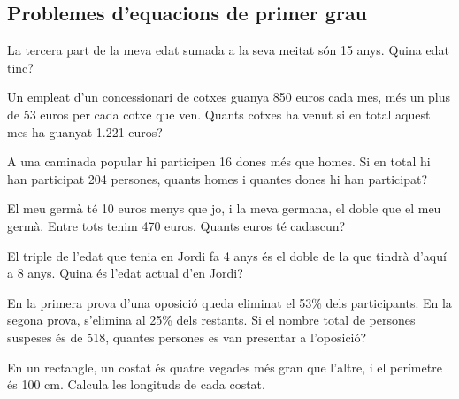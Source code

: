 \pagebreak
\subsection{Problemes d'equacions de primer grau}

\begin{mylist}
\exer  La tercera part de la meva edat sumada a la seva meitat són 15 anys. Quina edat tinc?  


\exer  Un empleat d'un concessionari de cotxes guanya 850 euros cada mes, més un plus de 53 euros per cada cotxe que ven. Quants cotxes ha venut si en total aquest mes ha guanyat 1.221 euros? 


\exer  A una caminada popular hi participen 16 dones més que homes. Si en total hi han participat 204 persones, quants homes i quantes dones hi han participat? 


\exer  El meu germà té 10 euros menys que jo, i la meva germana, el doble que el meu germà. Entre tots tenim 470 euros. Quants euros té cadascun? 


\exer  El triple de l'edat que tenia en Jordi fa 4 anys és el doble de la que tindrà d'aquí a 8 anys. Quina és l'edat actual d'en Jordi? 

 
\exer[1]  En la primera prova d'una oposició queda eliminat el 53\% dels participants. En la segona prova, s'elimina al 25\% dels restants. Si el nombre total de persones suspeses és de 518, quantes persones es van presentar a l'oposició?
 
\exer  En un rectangle, un costat és quatre vegades més gran que l'altre, i el perímetre és 100 cm. Calcula les longituds de cada costat.


\end{mylist}
